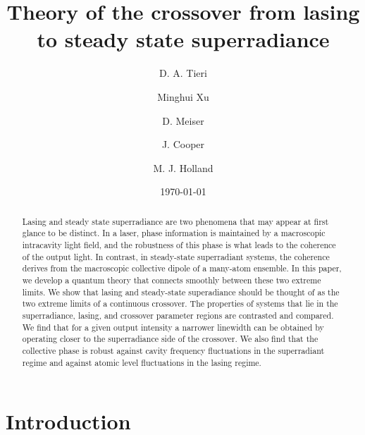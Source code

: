 \documentclass[aps,
twocolumn,
showpacs,
superscriptaddress,groupedaddress]{revtex4}
\begin{document}
\title{Theory of the crossover from lasing to steady state superradiance}
\author{D. A. Tieri}
\author{Minghui Xu}
\author{D. Meiser}
\author{J. Cooper}
\author{M. J. Holland}
\date{\today}

\begin{abstract}
  Lasing and steady state superradiance are two phenomena that may
  appear at first glance to be distinct.  In a laser, phase
  information is maintained by a macroscopic intracavity light field,
  and the robustness of this phase is what leads to the coherence of
  the output light.  In contrast, in steady-state superradiant
  systems, the coherence derives from the macroscopic collective
  dipole of a many-atom ensemble.  In this paper, we develop a quantum
  theory that connects smoothly between these two extreme limits.  We
  show that lasing and steady-state superadiance should be thought of
  as the two extreme limits of a continuous crossover. The properties
  of systems that lie in the superradiance, lasing, and crossover
  parameter regions are contrasted and compared.  We find that for a
  given output intensity a narrower linewidth can be obtained by
  operating closer to the superradiance side of the crossover.  We
  also find that the collective phase is robust against cavity
  frequency fluctuations in the superradiant regime and against atomic
  level fluctuations in the lasing regime.
\end{abstract}



\maketitle

\section{Introduction}
\end{document}
